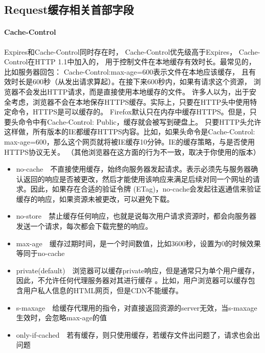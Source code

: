 \documentclass{book}
\begin{document}
\subsection{Request缓存相关首部字段}

\paragraph{Cache-Control}Expires和Cache-Control同时存在时，
Cache-Control优先级高于Expires，
Cache-Control在HTTP 1.1中加入的，
用于控制文件在本地缓存有效时长。最常见的，比如服务器回包：
Cache-Control:max-age=600表示文件在本地应该缓存，
且有效时长是600秒（从发出请求算起）。在接下来600秒内，如果有请求这个资源，
浏览器不会发出HTTP请求，而是直接使用本地缓存的文件。
许多人以为，出于安全考虑，浏览器不会在本地保存HTTPS缓存。实际上，只要在HTTP头中使用特定命令，HTTPS是可以缓存的。
Firefox默认只在内存中缓存HTTPS。但是，只要头命令中有Cache-Control: Public，缓存就会被写到硬盘上。
只要HTTP头允许这样做，所有版本的IE都缓存HTTPS内容。比如，如果头命令是Cache-Control: max-age=600，那么这个网页就将被IE缓存10分钟。IE的缓存策略，与是否使用HTTPS协议无关。
（其他浏览器在这方面的行为不一致，取决于你使用的版本）

\begin{itemize}
\item{no-cache}~~不直接使用缓存，始终向服务器发起请求。表示必须先与服务器确认返回的响应是否被更改，然后才能使用该响应来满足后续对同一个网址的请求。因此，如果存在合适的验证令牌 (ETag)，no-cache会发起往返通信来验证缓存的响应，如果资源未被更改，可以避免下载。
\item{no-store}~~禁止缓存任何响应，也就是说每次用户请求资源时，都会向服务器发送一个请求，每次都会下载完整的响应。
\item{max-age}~~缓存过期时间，是一个时间数值，比如3600秒，设置为0的时候效果等同于no-cache
\item{private(default)}~~浏览器可以缓存private响应，但是通常只为单个用户缓存，因此，不允许任何代理服务器对其进行缓存 。比如，用户浏览器可以缓存包含用户私人信息的HTML网页，但是CDN不能缓存。
\item{s-maxage}~~给缓存代理用的指令，对直接返回资源的server无效，当s-maxage生效时，会忽略max-age的值
\item{only-if-cached}~~若有缓存，则只使用缓存，若缓存文件出问题了，请求也会出问题
\end{itemize}
\end{document}
